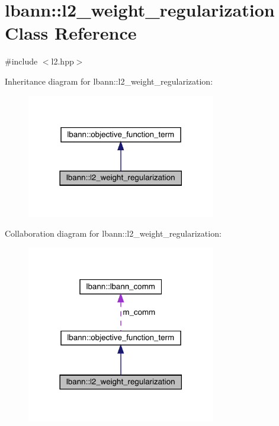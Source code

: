 \hypertarget{classlbann_1_1l2__weight__regularization}{}\section{lbann\+:\+:l2\+\_\+weight\+\_\+regularization Class Reference}
\label{classlbann_1_1l2__weight__regularization}


{\ttfamily \#include $<$l2.\+hpp$>$}



Inheritance diagram for lbann\+:\+:l2\+\_\+weight\+\_\+regularization\+:\nopagebreak
\begin{figure}[H]
\begin{center}
\leavevmode
\includegraphics[width=234pt]{classlbann_1_1l2__weight__regularization__inherit__graph}
\end{center}
\end{figure}


Collaboration diagram for lbann\+:\+:l2\+\_\+weight\+\_\+regularization\+:\nopagebreak
\begin{figure}[H]
\begin{center}
\leavevmode
\includegraphics[width=234pt]{classlbann_1_1l2__weight__regularization__coll__graph}
\end{center}
\end{figure}
